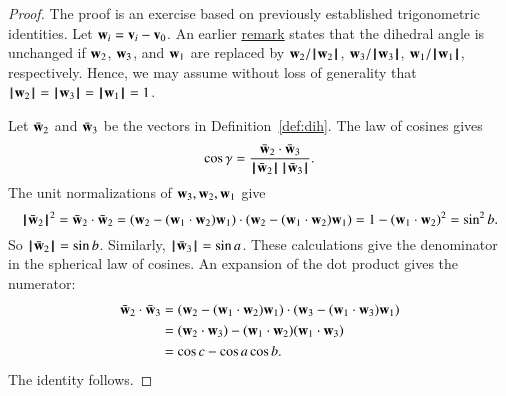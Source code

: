 \begin{proof} The proof is an exercise based on previously established
  trigonometric identities.  Let $\w_i = \v_i-\v_0$.  An earlier
  \hyperref[rem:dih]{remark} states that the dihedral angle is
  unchanged if $\w_2$, $\w_3$, and $\w_1$ are replaced by
  $\w_2/\normo{\w_2}$, $\w_3/\normo{\w_3}$, $\w_1/\normo{\w_1}$,
  respectively.  Hence, we may assume without loss of generality that
  $\normo{\w_2}=\normo{\w_3}=\normo{\w_1}=1$.

Let $\bar \w_2$ and $\bar \w_3$ be the vectors in Definition~\ref{def:dih}.
The law of cosines gives
\begin{displaymath}\cos\gamma = \frac{\bar \w_2\cdot \bar \w_3}
{\normo{\bar \w_2}\,\normo{\bar \w_3}}.
\end{displaymath}
The unit normalizations of $\w_3,\w_2,\w_1$ give
\begin{displaymath}
\normo{\bar \w_2}^2 = \bar \w_2\cdot \bar \w_2 =
(\w_2 - (\w_1\cdot \w_2)\w_1)\cdot (\w_2 - (\w_1\cdot \w_2) \w_1) =
1 - (\w_1\cdot \w_2)^2 = \sin^2 b.
\end{displaymath}
So $\normo{\bar \w_2} =\sin b$. Similarly, $\normo{\bar \w_3} = \sin a$.
These calculations give the denominator in the spherical law of cosines.  An
expansion of the dot product gives the numerator:
\begin{align*}
\bar \w_2\cdot \bar \w_3 &=
 (\w_2 - (\w_1\cdot \w_2) \w_1)\cdot (\w_3 - (\w_1\cdot \w_3) \w_1)\\
&= (\w_2\cdot \w_3) - (\w_1\cdot \w_2) (\w_1\cdot \w_3) \\
&= \cos c - \cos a \cos b.
\end{align*}
The identity follows.
\end{proof}

